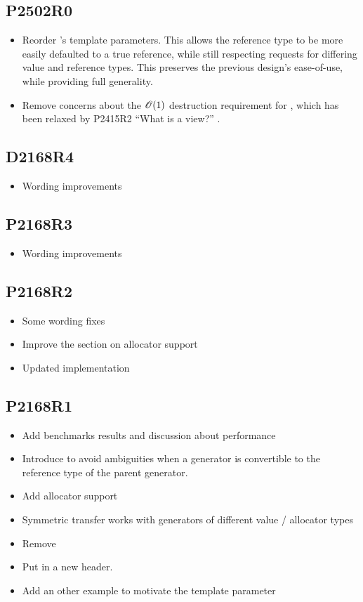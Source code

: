 \documentclass{wg21}
\begin{document}
\subsection{P2502R0}
\begin{itemize}
\item Reorder 's template parameters.
  This allows the reference type to be
  more easily defaulted to a true reference,
  while still respecting requests for
  differing value and reference types.
  This preserves the previous design's ease-of-use,
  while providing full generality.
\item Remove concerns about the $\mathscr{O}(1)$ destruction requirement for ,
  which has been relaxed by P2415R2 ``What is a view?'' \cite{P2415R2}.
\end{itemize}

\subsection{D2168R4}
\begin{itemize}
\item Wording improvements
\end{itemize}

\subsection{P2168R3}
\begin{itemize}
\item Wording improvements
\end{itemize}

\subsection{P2168R2}
\begin{itemize}
\item Some wording fixes
\item Improve the section on allocator support
\item Updated implementation
\end{itemize}

\subsection{P2168R1}
\begin{itemize}
\item Add benchmarks results and discussion about performance
\item Introduce  to avoid ambiguities when a generator is convertible to the reference type of the parent generator.
\item Add allocator support
\item Symmetric transfer works with generators of different value / allocator types
\item Remove 
\item Put  in a new  header.
\item Add an other example to motivate the  template parameter
\end{itemize}
\end{document}
